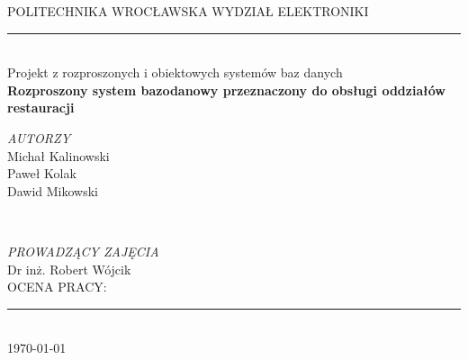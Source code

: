 \documentclass{article}
\begin{document}
 
\begin{titlepage} 
	\newcommand{\HRule}{\rule{\linewidth}{0.5mm}} 
	
	\center 
	
	\textsc{\LARGE POLITECHNIKA WROCŁAWSKA WYDZIAŁ ELEKTRONIKI}
	
	\HRule\\[3.0cm]
	
	{\huge Projekt z rozproszonych i obiektowych systemów baz danych}\\[2.0cm] 
	
	{\huge\bfseries Rozproszony system bazodanowy przeznaczony do obsługi oddziałów restauracji}\\[2.0cm] 
	
	
	

	\begin{minipage}{0.4\textwidth}
		\begin{flushleft}
			\large
			\textit{AUTORZY}\\
			Michał Kalinowski\\
			Paweł Kolak\\
			Dawid Mikowski\\
		\end{flushleft}
	\end{minipage}
	~
	\begin{minipage}{0.4\textwidth}
		\begin{flushright}
			\large
			\textit{PROWADZĄCY ZAJĘCIA}\\
			Dr inż. Robert Wójcik
			\\[2.0cm] 
			OCENA PRACY:
		\end{flushright}
	\end{minipage}
	
	
	
	\vfill\vfill\vfill %
	\HRule\\[0.5cm]
	{\large\today} %
	
	
	 
	
	\vfill %
	
\end{titlepage}
\clearpage
\end{document}
